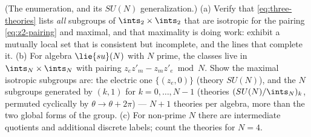 \begin{exercise}[classic]
\label{exr:maximal-lattices}
(The enumeration, and its $SU(N)$ generalization.) (a) Verify that
\eqref{eq:three-theories} lists \emph{all} subgroups of $\ints_2 \times
\ints_2$ that are isotropic for the pairing \eqref{eq:z2-pairing} and
maximal, and that maximality is doing work: exhibit a mutually local set
that is consistent but incomplete, and the lines that complete it. (b)
For algebra $\lie{su}(N)$ with $N$ prime, the classes live in $\ints_N
\times \ints_N$ with pairing $z_e z'_m - z_m z'_e \bmod N$. Show the
maximal isotropic subgroups are: the electric one $\{(z_e, 0)\}$
(theory $SU(N)$), and the $N$ subgroups generated by $(k, 1)$ for $k =
0, \dots, N-1$ (theories $(SU(N)/\ints_N)_k$, permuted cyclically by
$\theta \to \theta + 2\pi$) --- $N + 1$ theories per algebra, more than
the two global forms of the group. (c) For non-prime $N$ there are
intermediate quotients and additional discrete labels; count the
theories for $N = 4$.
\end{exercise}

